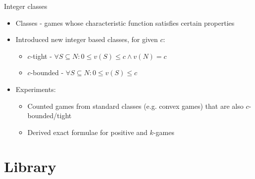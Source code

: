 \documentclass{beamer}
\begin{document}


\begin{frame}{Integer classes}
    \pause
    \begin{itemize}
        \item Classes - games whose characteristic function satisfies certain properties
        \pause
        \item Introduced new integer based classes, for given $c$:
        \begin{itemize}
            \item $c$-tight - $\forall S \subseteq N: 0 \leq v(S) \leq c \land v(N) = c$
            \item $c$-bounded - $\forall S \subseteq N: 0 \leq v(S) \leq c$
        \end{itemize}
        \pause
        \item Experiments:
        \begin{itemize}
            \item Counted games from standard classes (e.g. convex games) that are also $c$-bounded/tight
            \item Derived exact formulae for positive and $k$-games
        \end{itemize}
    \end{itemize}
\end{frame}



\section{Library}

\end{document}
